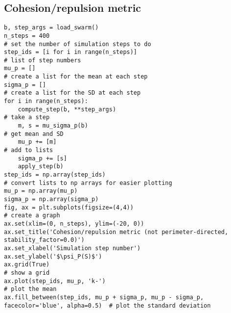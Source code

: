 \documentclass{article}
\begin{document}
\subsection{Cohesion/repulsion metric}
\begin{verbatim}
b, step_args = load_swarm()
n_steps = 400                                                                          # set the number of simulation steps to do
step_ids = [i for i in range(n_steps)]                                                  # list of step numbers
mu_p = []                                                                               # create a list for the mean at each step
sigma_p = []                                                                            # create a list for the SD at each step
for i in range(n_steps):                                                                
    compute_step(b, **step_args)                                                        # take a step
    m, s = mu_sigma_p(b)                                                                # get mean and SD
    mu_p += [m]                                                                         # add to lists
    sigma_p += [s]
    apply_step(b)
step_ids = np.array(step_ids)                                                           # convert lists to np arrays for easier plotting
mu_p = np.array(mu_p)
sigma_p = np.array(sigma_p)
fig, ax = plt.subplots(figsize=(4,4))                                                   # create a graph
ax.set(xlim=(0, n_steps), ylim=(-20, 0))  
ax.set_title('Cohesion/repulsion metric (not perimeter-directed, stability_factor=0.0)')
ax.set_xlabel('Simulation step number')
ax.set_ylabel('$\psi_P(S)$')
ax.grid(True)                                                                           # show a grid
ax.plot(step_ids, mu_p, 'k-')                                                           # plot the mean
ax.fill_between(step_ids, mu_p + sigma_p, mu_p - sigma_p, facecolor='blue', alpha=0.5)  # plot the standard deviation
\end{verbatim}
\end{document}
